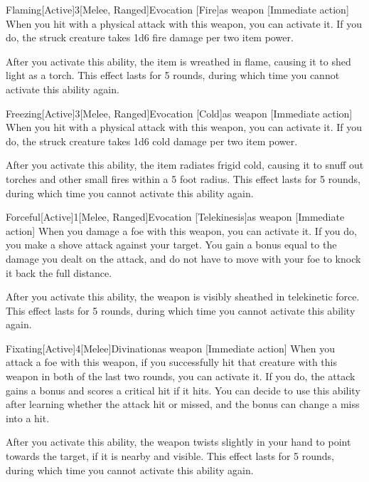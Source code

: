        \begin{magicitemdef}{Flaming}[Active]{3}[Melee, Ranged]{Evocation [Fire]}{as weapon}
            [Immediate action] When you hit with a physical attack with this weapon, you can activate it.
            If you do, the struck creature takes 1d6 fire damage per two item power.

            After you activate this ability, the item is wreathed in flame, causing it to shed light as a torch.
            This effect lasts for 5 rounds, during which time you cannot activate this ability again.
        \end{magicitemdef}

        \begin{magicitemdef}{Freezing}[Active]{3}[Melee, Ranged]{Evocation [Cold]}{as weapon}
            [Immediate action] When you hit with a physical attack with this weapon, you can activate it.
            If you do, the struck creature takes 1d6 cold damage per two item power.

            After you activate this ability, the item radiates frigid cold, causing it to snuff out torches and other small fires within a 5 foot radius.
            This effect lasts for 5 rounds, during which time you cannot activate this ability again.
        \end{magicitemdef}

        \begin{magicitemdef}{Forceful}[Active]{1}[Melee, Ranged]{Evocation [Telekinesis]}{as weapon}
            [Immediate action] When you damage a foe with this weapon, you can activate it.
            If you do, you make a shove attack against your target.
            You gain a bonus equal to the damage you dealt on the attack, and do not have to move with your foe to knock it back the full distance.

            After you activate this ability, the weapon is visibly sheathed in telekinetic force.
            This effect lasts for 5 rounds, during which time you cannot activate this ability again.
        \end{magicitemdef}

        \begin{magicitemdef}{Fixating}[Active]{4}[Melee]{Divination}{as weapon}
            [Immediate action] When you attack a foe with this weapon, if you successfully hit that creature with this weapon in both of the last two rounds, you can activate it.
            If you do, the attack gains a  bonus and scores a critical hit if it hits.
            You can decide to use this ability after learning whether the attack hit or missed, and the bonus can change a miss into a hit.

            After you activate this ability, the weapon twists slightly in your hand to point towards the target, if it is nearby and visible.
            This effect lasts for 5 rounds, during which time you cannot activate this ability again.
        \end{magicitemdef}

